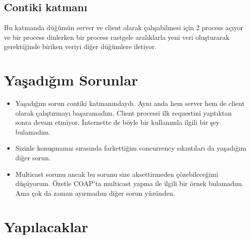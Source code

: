 \documentclass{article}
\begin{document}
\subsection{Contiki katmanı}
Bu katmanda düğümün server ve client olarak çalışabilmesi için 2 process açıyor ve bir process dinlerken bir process rastgele aralıklarla yeni veri oluşturarak gerektiğinde biriken veriyi diğer düğümlere iletiyor.

\section{Yaşadığım Sorunlar}

\begin{itemize}
\item Yaşadığım sorun contiki katmanındaydı. Aynı anda hem server hem de client olarak çalıştırmayı başaramadım. Client processi ilk requestini yaptıktan sonra devam etmiyor. İnternette de böyle bir kullanımla ilgili bir şey bulamadım. 
\item Sizinle konuşmamız sırasında farkettiğim concurrency sıkıntıları da yaşadığım diğer sorun.
\item Multicast sorunu ancak bu sorunu size aksettirmeden çözebileceğimi düşüyorum. Özetle COAP'ta multicast yapma ile ilgili bir örnek bulamadım. Ama çok da zaman ayırmadım diğer sorun yüzünden.
\end{itemize}

\newpage
\section{Yapılacaklar}
\end{document}
